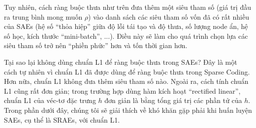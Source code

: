 Tuy nhiên, cách ràng buộc thưa như trên đưa thêm một siêu tham số (giá trị đầu ra trung bình mong muốn $\rho$) vào danh sách các siêu tham số vốn đã có rất nhiều của SAEs (hệ số ``thỏa hiệp'' giữa độ lỗi tái tạo và độ thưa, số lượng node ẩn, hệ số học, kích thước ``mini-batch'', ...). Điều này sẽ làm cho quá trình chọn lựa các siêu tham số trở nên ``phiền phức'' hơn và tốn thời gian hơn. 

Tại sao lại không dùng chuẩn L1 để ràng buộc thưa trong SAEs? Đây là một cách tự nhiên vì chuẩn L1 đã được dùng để ràng buộc thưa trong Sparse Coding. Hơn nữa, chuẩn L1 không đưa thêm siêu tham số nào. Ngoài ra, cách tính chuẩn L1 cũng rất đơn giản; trong trường hợp dùng hàm kích hoạt ``rectified linear'', chuẩn L1 của véc-tơ đặc trưng $h$ đơn giản là bằng tổng giá trị các phần tử của $h$. Trong phần dưới đây, chúng tôi sẽ giải thích về khó khăn gặp phải khi huấn luyện SAEs, cụ thể là SRAEs, với chuẩn L1.
